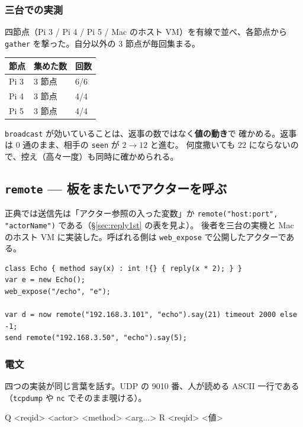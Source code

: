 \documentclass[11pt,a4paper]{ltjsarticle}
\begin{document}
\subsubsection*{三台での実測}

四節点（Pi 3 / Pi 4 / Pi 5 / Mac のホスト VM）を有線で並べ、各節点から
\texttt{gather} を撃った。自分以外の 3 節点が毎回集まる。

\begin{center}
\begin{tabular}{lll}
\hline
節点 & 集めた数 & 回数 \\
\hline
Pi 3 & 3 節点 & 6/6 \\
Pi 4 & 3 節点 & 4/4 \\
Pi 5 & 3 節点 & 4/4 \\
\hline
\end{tabular}
\end{center}

\texttt{broadcast} が効いていることは、返事の数ではなく\textbf{値の動き}で
確かめる。返事は 0 通のまま、相手の \texttt{seen} が $2 \to 12$ と進む。
何度撒いても $22$ にならないので、控え（高々一度）も同時に確かめられる。

\subsection{\texttt{remote} --- 板をまたいでアクターを呼ぶ}
\label{sec:xinu-remote}

正典では送信先は「アクター参照の入った変数」か
\texttt{remote("host:port", "actorName")} である（\S\ref{sec:reply1st} の表を見よ）。
後者を三台の実機と Mac のホスト VM に実装した。呼ばれる側は
\texttt{web\_expose} で公開したアクターである。

\begin{lstlisting}
class Echo { method say(x) : int !{} { reply(x * 2); } }
var e = new Echo();
web_expose("/echo", "e");

var d = now remote("192.168.3.101", "echo").say(21) timeout 2000 else -1;
send remote("192.168.3.50", "echo").say(5);
\end{lstlisting}

\subsubsection*{電文}

四つの実装が同じ言葉を話す。UDP の 9010 番、人が読める ASCII 一行である
（\texttt{tcpdump} や \texttt{nc} でそのまま覗ける）。

\begin{term}
Q <reqid> <actor> <method> <arg...>
R <reqid> <値>
\end{term}
\end{document}

